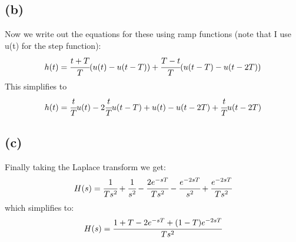\documentclass{article}
\begin{document}
\subsection*{(b)}
Now we write out the equations for these using ramp functions (note that I use u(t) for the step function):
\[h(t)=\cfrac{t+T}{T}(u(t)-u(t-T))+\cfrac{T-t}{T}(u(t-T)-u(t-2T))\]
This simplifies to
\[h(t)=\cfrac{t}{T}u(t)-2\cfrac{t}{T}u(t-T)+u(t)-u(t-2T)+\cfrac{t}{T}u(t-2T)\]
\subsection*{(c)}
Finally taking the Laplace transform we get:
\[H(s)=\cfrac{1}{Ts^{2}}+\cfrac{1}{s^{2}}-\cfrac{2e^{-sT}}{Ts^{2}}-\cfrac{e^{-2sT}}{s^{2}}+\cfrac{e^{-2sT}}{Ts^2}\]
which simplifies to:
\[H(s)=\cfrac{1+T-2e^{-sT}+(1-T)e^{-2sT}}{Ts^2}\]
\end{document}
